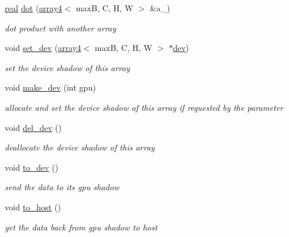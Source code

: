\begin{DoxyCompactItemize}
\hyperlink{vgg__util_8h_a1082d08aaa761215ec83e7149f27ad16}{real} \hyperlink{structarray4_a3827cfcadd9a47c0f199ababeed1565c}{dot} (\hyperlink{structarray4}{array4}$<$ maxB, C, H, W $>$ \&a\+\_\+)
\begin{DoxyCompactList}\small\item\em dot product with another array \end{DoxyCompactList}\item 
void \hyperlink{structarray4_acd8ae42dbddd396fb1a88debdd1bf8e7}{set\+\_\+dev} (\hyperlink{structarray4}{array4}$<$ maxB, C, H, W $>$ $\ast$\hyperlink{structarray4_a19e463f2ae72c48b92ac558f06366a17}{dev})
\begin{DoxyCompactList}\small\item\em set the device shadow of this array \end{DoxyCompactList}\item 
void \hyperlink{structarray4_a05126cf0d9fec621264e095d587864da}{make\+\_\+dev} (int gpu)
\begin{DoxyCompactList}\small\item\em allocate and set the device shadow of this array if requested by the parameter \end{DoxyCompactList}\item 
\mbox{\label{structarray4_a53b8b089c3186e3bd2dc51f8a6c1533d}} 
void \hyperlink{structarray4_a53b8b089c3186e3bd2dc51f8a6c1533d}{del\+\_\+dev} ()
\begin{DoxyCompactList}\small\item\em deallocate the device shadow of this array \end{DoxyCompactList}\item 
\mbox{\label{structarray4_a98fbca33be98702d92368dba1386a879}} 
void \hyperlink{structarray4_a98fbca33be98702d92368dba1386a879}{to\+\_\+dev} ()
\begin{DoxyCompactList}\small\item\em send the data to its gpu shadow \end{DoxyCompactList}\item 
\mbox{\label{structarray4_a4d32a5c08163fc8ad6fcc6c4ffb1cfe4}} 
void \hyperlink{structarray4_a4d32a5c08163fc8ad6fcc6c4ffb1cfe4}{to\+\_\+host} ()
\begin{DoxyCompactList}\small\item\em get the data back from gpu shadow to host \end{DoxyCompactList}\end{DoxyCompactItemize}
